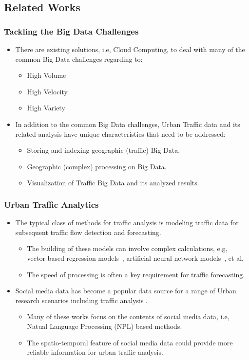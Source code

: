 \subsection{Related Works}

\begin{frame}
    \frametitle{Tackling the Big Data Challenges}
    \begin{itemize}
	    \item There are existing solutions, i.e, Cloud Computing, to deal with many of the common Big Data challenges regarding to:
	        \begin{itemize}
	            \item High Volume
	            \item High Velocity
	            \item High Variety
	        \end{itemize}
	    \item In addition to the common Big Data challenges, Urban Traffic data and its related analysis have unique characteristics that need to be addressed:
	    \begin{itemize}
	        \item Storing and indexing geographic (traffic) Big Data.
	        \item Geographic (complex) processing on Big Data.
	        \item Visualization of Traffic Big Data and its analyzed results.
	    \end{itemize}
    \end{itemize}
\end{frame}

\begin{frame}
    \frametitle{Urban Traffic Analytics}
    \begin{itemize}
	    \item The typical class of methods for traffic analysis is modeling traffic data for subsequent traffic flow detection and forecasting.
	    \begin{itemize}
	        \item The building of these models can involve complex calculations, e.g, vector-based regression models~\cite{cao2007robust}, artificial neural network models~\cite{ye2009neural}, et al.
	        \item The speed of processing is often a key requirement for traffic forecasting.
	    \end{itemize}
	    \item Social media data has become a popular data source for a range of Urban research scenarios including traffic analysis \cite{feldman2013techniques}.
	    \begin{itemize}
	        \item Many of these works focus on the contents of social media data, i.e, Natual Language Processing (NPL) based methods.
	        \item The spatio-temporal feature of social media data could provide more reliable information for urban traffic analysis.
	    \end{itemize}
    \end{itemize}
\end{frame}

